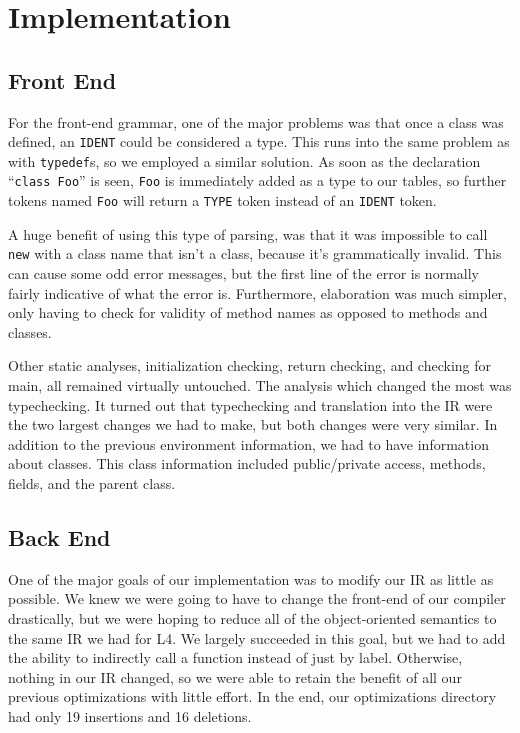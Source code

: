 \documentclass{article}
\begin{document}
\section{Implementation}

\subsection{Front End}

For the front-end grammar, one of the major problems was that once a class was
defined, an \texttt{IDENT} could be considered a type. This runs into the same
problem as with \texttt{typedef}s, so we employed a similar solution. As soon
as the declaration ``\texttt{class Foo}'' is seen, \texttt{Foo} is immediately
added as a type to our tables, so further tokens named \texttt{Foo} will return
a \texttt{TYPE} token instead of an \texttt{IDENT} token.

A huge benefit of using this type of parsing, was that it was impossible to
call \texttt{new} with a class name that isn't a class, because it's
grammatically invalid. This can cause some odd error messages, but the first
line of the error is normally fairly indicative of what the error is.
Furthermore, elaboration was much simpler, only having to check for validity
of method names as opposed to methods and classes.

Other static analyses, initialization checking, return checking, and checking
for main, all remained virtually untouched. The analysis which changed the most
was typechecking. It turned out that typechecking and translation into the IR
were the two largest changes we had to make, but both changes were very similar.
In addition to the previous environment information, we had to have information
about classes. This class information included public/private access, methods,
fields, and the parent class.

\subsection{Back End}

One of the major goals of our implementation was to modify our IR as little as
possible. We knew we were going to have to change the front-end of our compiler
drastically, but we were hoping to reduce all of the object-oriented semantics
to the same IR we had for L4. We largely succeeded in this goal, but we had to
add the ability to indirectly call a function instead of just by label.
Otherwise, nothing in our IR changed, so we were able to retain the benefit of
all our previous optimizations with little effort. In the end, our
optimizations directory had only 19 insertions and 16 deletions.
\end{document}
